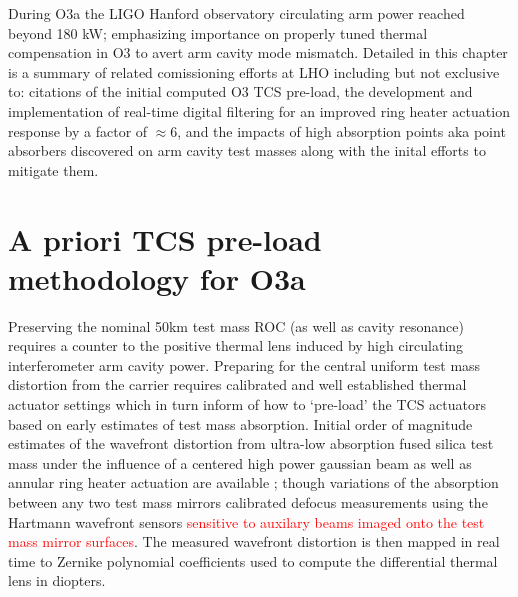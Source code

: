 



During O3a the LIGO Hanford observatory circulating arm power reached beyond 180 kW; emphasizing importance on properly tuned thermal compensation in O3 to avert arm cavity mode mismatch. Detailed in this chapter is a summary of related comissioning efforts at LHO including but not exclusive to: citations of the initial computed O3 TCS pre-load, the development and implementation of real-time digital filtering for an improved ring heater actuation response by a factor of $\approx 6$, and the impacts of high absorption points aka point absorbers discovered on arm cavity test masses along with the inital efforts to mitigate them. 

\section{A priori TCS pre-load methodology for O3a}
Preserving the nominal 50km test mass ROC (as well as cavity resonance) requires a counter to the positive thermal lens induced by high circulating interferometer arm cavity power. Preparing for the central uniform test mass distortion from the carrier requires calibrated and well established thermal actuator settings which in turn inform of how to `pre-load' the TCS actuators based on early estimates of test mass absorption. Initial order of magnitude estimates of the wavefront distortion from ultra-low absorption fused silica test mass under the influence of a centered high power gaussian beam as well as annular ring heater actuation are available \cite{hello_vinet, Ramette:16}; though variations of the absorption between any two test mass mirrors calibrated defocus measurements using the Hartmann wavefront sensors \textcolor{red}{sensitive to auxilary beams imaged onto the test mass mirror surfaces}. The measured wavefront distortion is then mapped in real time to Zernike polynomial coefficients used to compute the differential thermal lens in diopters. 

